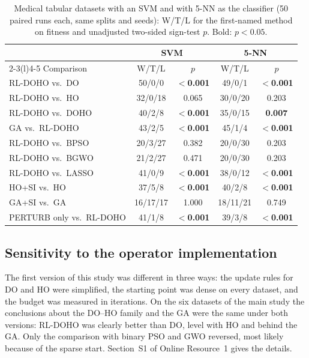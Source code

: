 \documentclass[pdflatex,sn-basic]{sn-jnl}
\begin{document}
\begin{table}[t]
\centering
\caption{Medical tabular datasets with an SVM and with 5-NN as the classifier (50 paired runs each, same splits and seeds): W/T/L for the first-named method on fitness and unadjusted two-sided sign-test $p$. Bold: $p<0.05$.}
\label{tab:svm}
\footnotesize
\setlength{\tabcolsep}{2.6pt}
\begin{tabular}{@{}lcccc@{}}
\toprule
& \multicolumn{2}{c}{SVM} & \multicolumn{2}{c}{5-NN} \\
\cmidrule(lr){2-3}\cmidrule(l){4-5}
Comparison & W/T/L & $p$ & W/T/L & $p$ \\
\midrule
RL-DOHO vs.\ DO & 50/0/0 & \textbf{$<$0.001} & 49/0/1 & \textbf{$<$0.001} \\
RL-DOHO vs.\ HO & 32/0/18 & 0.065 & 30/0/20 & 0.203 \\
RL-DOHO vs.\ DOHO & 40/2/8 & \textbf{$<$0.001} & 35/0/15 & \textbf{0.007} \\
GA vs.\ RL-DOHO & 43/2/5 & \textbf{$<$0.001} & 45/1/4 & \textbf{$<$0.001} \\
RL-DOHO vs.\ BPSO & 20/3/27 & 0.382 & 20/0/30 & 0.203 \\
RL-DOHO vs.\ BGWO & 21/2/27 & 0.471 & 20/0/30 & 0.203 \\
RL-DOHO vs.\ LASSO & 41/0/9 & \textbf{$<$0.001} & 38/0/12 & \textbf{$<$0.001} \\
\midrule
HO+SI vs.\ HO & 37/5/8 & \textbf{$<$0.001} & 40/2/8 & \textbf{$<$0.001} \\
GA+SI vs.\ GA & 16/17/17 & 1.000 & 18/11/21 & 0.749 \\
PERTURB only vs.\ RL-DOHO & 41/1/8 & \textbf{$<$0.001} & 39/3/8 & \textbf{$<$0.001} \\
\bottomrule
\end{tabular}
\end{table}


\subsection{Sensitivity to the operator implementation}
The first version of this study was different in three ways: the update rules for DO and HO were simplified, the starting point was dense on every dataset, and the budget was measured in iterations. On the six datasets of the main study the conclusions about the DO--HO family and the GA were the same under both versions: RL-DOHO was clearly better than DO, level with HO and behind the GA. Only the comparison with binary PSO and GWO reversed, most likely because of the sparse start. Section~S1 of Online Resource~1 gives the details.
\end{document}
